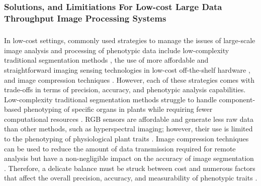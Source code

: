 \subsubsection{Solutions, and Limitiations For Low-cost Large Data Throughput Image Processing Systems}
\subparagraph{}
In low-cost settings, commonly used strategies to manage the issues of large-scale image analysis and processing of phenotypic data include low-complexity traditional segmentation methods \cite{minerviniImageAnalysisNew2015}, the use of more affordable and straightforward imaging sensing technologies in low-cost off-the-shelf hardware \cite{tovarRaspberryPiPowered2018a}, and image compression techniques \cite{minerviniApplicationawareImageCompression2013}. However, each of these strategies comes with trade-offs in terms of precision, accuracy, and phenotypic analysis capabilities. Low-complexity traditional segmentation methods struggle to handle component-based phenotyping of specific organs in plants while requiring fewer computational resources \cite{choudhurySegmentationTechniquesChallenges2020}. RGB sensors are affordable and generate less raw data than other methods, such as hyperspectral imaging; however, their use is limited to the phenotyping of physiological plant traits \cite{liReviewImagingTechniques2014}. Image compression techniques can be used to reduce the amount of data transmission required for remote analysis but have a non-negligible impact on the accuracy of image segmentation \cite{minerviniApplicationawareImageCompression2013}. Therefore, a delicate balance must be struck between cost and numerous factors that affect the overall precision, accuracy, and measurability of phenotypic traits \cite{muller-linowPlantScreenMobile2019}.

